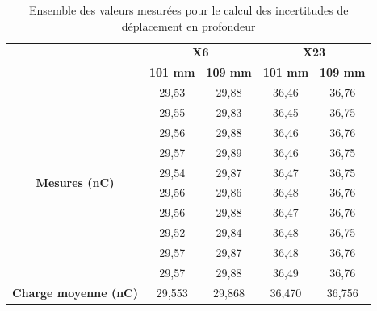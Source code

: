 \documentclass{article}
\begin{document}
\begin{table}[h]
  \centering
  \begin{tabular}{c|cc|cc|}
  \cline{2-5}
  \textbf{} & \multicolumn{2}{c|}{\textbf{X6}} & \multicolumn{2}{c|}{\textbf{X23}} \\ \cline{2-5} 
  \textbf{} & \textbf{101 mm} & \textbf{109 mm} & \textbf{101 mm} & \textbf{109 mm} \\ \hline
  \multicolumn{1}{|c|}{\multirow{10}{*}{\textbf{Mesures (nC)}}} & 29,53 & 29,88 & 36,46 & 36,76 \\
  \multicolumn{1}{|c|}{} & 29,55 & 29,83 & 36,45 & 36,75 \\
  \multicolumn{1}{|c|}{} & 29,56 & 29,88 & 36,46 & 36,76 \\
  \multicolumn{1}{|c|}{} & 29,57 & 29,89 & 36,46 & 36,75 \\
  \multicolumn{1}{|c|}{} & 29,54 & 29,87 & 36,47 & 36,75 \\
  \multicolumn{1}{|c|}{} & 29,56 & 29,86 & 36,48 & 36,76 \\
  \multicolumn{1}{|c|}{} & 29,56 & 29,88 & 36,47 & 36,76 \\
  \multicolumn{1}{|c|}{} & 29,52 & 29,84 & 36,48 & 36,75 \\
  \multicolumn{1}{|c|}{} & 29,57 & 29,87 & 36,48 & 36,76 \\
  \multicolumn{1}{|c|}{} & 29,57 & 29,88 & 36,49 & 36,76 \\ \hline
  \multicolumn{1}{|c|}{\textbf{Charge moyenne   (nC)}} & 29,553 & 29,868 & 36,470 & 36,756 \\ \hline
  \end{tabular}
  \caption{Ensemble des valeurs mesurées pour le calcul des incertitudes de déplacement en profondeur}
  \label{table_mesure_dep_prof}
  \end{table}

\clearpage


\nocite{*}
\end{document}
